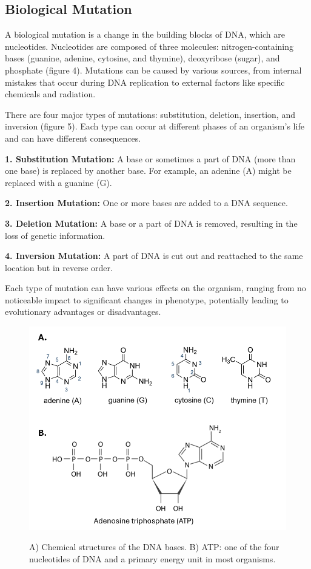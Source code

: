 \documentclass[12pt]{article}
\begin{document}
\subsection{Biological Mutation}

A biological mutation is a change in the building blocks of DNA, which are nucleotides. Nucleotides are composed of three molecules: nitrogen-containing bases (guanine, adenine, cytosine, and thymine), deoxyribose (sugar), and phosphate (figure 4). Mutations can be caused by various sources, from internal mistakes that occur during DNA replication to external factors like specific chemicals and radiation.

There are four major types of mutations: substitution, deletion, insertion, and inversion (figure 5). Each type can occur at different phases of an organism's life and can have different consequences. 

    \textbf{1. Substitution Mutation:} A base or sometimes a part of DNA (more than one base) is replaced by another base. For example, an adenine (A) might be replaced with a guanine (G).

    \textbf{2. Insertion Mutation:} One or more bases are added to a DNA sequence. 

    \textbf{3. Deletion Mutation:} A base or a part of DNA is removed, resulting in the loss of genetic information.

    \textbf{4. Inversion Mutation:} A part of DNA is cut out and reattached to the same location but in reverse order.

Each type of mutation can have various effects on the organism, ranging from no noticeable impact to significant changes in phenotype, potentially leading to evolutionary advantages or disadvantages.\\[6px]

 

\begin{figure}[H]
\centering
\includegraphics[scale=.8]{Picture10}\\
\caption{A) Chemical structures of the DNA bases. B) ATP: one of the four nucleotides of DNA and a primary energy unit in most organisms.}
\end{figure}
\end{document}
